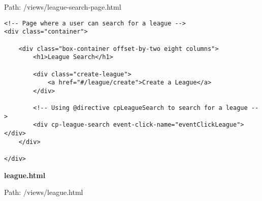 Path: /views/league-search-page.html

{\scriptsize
\begin{lstlisting}
<!-- Page where a user can search for a league -->
<div class="container">

	<div class="box-container offset-by-two eight columns">
		<h1>League Search</h1>

		<div class="create-league">
			<a href="#/league/create">Create a League</a>
		</div>

		<!-- Using @directive cpLeagueSearch to search for a league -->
		<div cp-league-search event-click-name="eventClickLeague"></div>
	</div>

</div>\end{lstlisting}
}
\textbf{league.html}\label{league.html}

Path: /views/league.html

